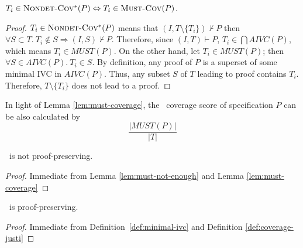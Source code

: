 \begin{lemma}
  \label{lem:must-coverage}
$T_i \in \text{\sc Nondet-Cov$^{*}$} (P) \Leftrightarrow T_i \in \text{\sc Must-Cov}(P)$.
\end{lemma}
\begin{proof}
$T_i \in \text{\sc Nondet-Cov$^{*}$} (P)$ means that $(I, T \setminus \{ T_i \}) \nvdash P$ then
$\forall S \subset T .~ T_i \notin S \Rightarrow (I, S) \nvdash P$.
Therefore, since $(I, T) \vdash P$, $T_i \in \bigcap AIVC(P)$, which means  $T_i \in MUST(P)$.
On the other hand, let $T_i \in MUST(P)$; then $\forall S \in AIVC(P).~ T_i \in S$.
By definition, any proof of $P$ is a superset of some minimal IVC in $AIVC(P)$.
Thus, any subset $S$ of $T$ leading to proof contains $T_i$.
Therefore, $T \setminus \{ T_i \}$ does not lead to a proof.

\end{proof}
\vspace{2mm}

In light of Lemma \ref{lem:must-coverage}, the \nondetcovalt\ coverage score of specification $P$ can be also calculated by
$$\frac{|MUST(P)|}{|T|}$$


%
\begin{corollary}
\label{cor:must-not-provable}
\nondetcovalt\ is not proof-preserving.
\end{corollary}
\begin{proof}
Immediate from Lemma \ref{lem:must-not-enough} and Lemma \ref{lem:must-coverage}
\end{proof}
\vspace{2mm}
\begin{corollary}
\label{cor:ivc-provable}
\ivccov\ is proof-preserving.
\end{corollary}
\begin{proof}
Immediate from Definition~\ref{def:minimal-ivc} and Definition \ref{def:coverage-justi}
\end{proof}
\vspace{2mm}


